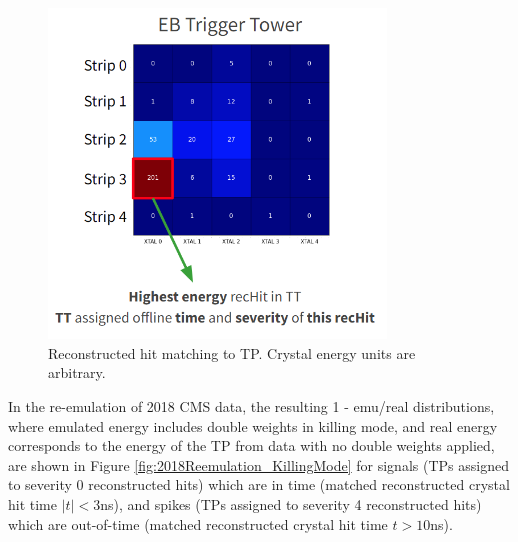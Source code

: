 \begin{figure}[H]
    \centering
    \includegraphics[width=0.8\textwidth]{Images/ECAL/DW/TPRecHitMatching.png}
    \caption{Reconstructed hit matching to TP. Crystal energy units are arbitrary.}
    \label{fig:RecHitTPMatching}
\end{figure}

In the re-emulation of 2018 CMS data, the resulting 1 - emu/real distributions, where emulated energy includes double weights in killing mode, and real energy corresponds to the energy of the TP from data with no double weights applied, are shown in Figure \ref{fig:2018Reemulation_KillingMode} for signals (TPs assigned to severity 0 reconstructed hits) which are in time (matched reconstructed crystal hit time $|t| < 3$ns), and spikes (TPs assigned to severity 4 reconstructed hits) which are out-of-time (matched reconstructed crystal hit time $t > 10$ns). 

